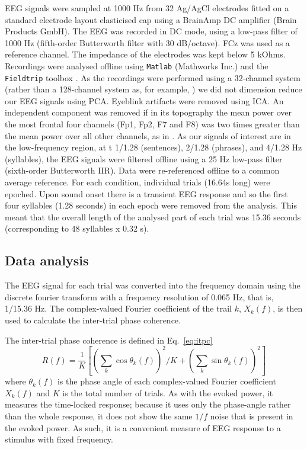\documentclass[a4paper,10pt,twoside]{article}
\begin{document}
EEG signals were sampled at 1000 Hz from 32 Ag/AgCl electrodes fitted on a standard electrode layout elasticised cap using a BrainAmp DC amplifier (Brain Products GmbH). The EEG was recorded in DC mode, using a low-pass filter of 1000 Hz (fifth-order Butterworth filter with 30 dB/octave). FCz was used as a reference channel. The impedance of the electrodes was kept below 5 kOhms. Recordings were analysed offline using \texttt{Matlab} (Mathworks Inc.) and the \texttt{Fieldtrip} toolbox \cite{FieldTrip}. As the recordings were performed using a 32-channel system (rather than a 128-channel system as, for example, \citet{DingEtAl2017}) we did not dimension reduce our EEG signals using PCA. Eyeblink artifacts were removed using ICA. An independent component was removed if in its topography the mean power over the most frontal four channels (Fp1, Fp2, F7 and F8) was two times greater than the mean power over all other channels, as in \citet{DingEtAl2017}. As our signals of interest are in the low-frequency region, at t 1/1.28 (sentences), 2/1.28 (phrases), and 4/1.28 Hz (syllables), the EEG signals were filtered offline using a 25 Hz low-pass filter (sixth-order Butterworth IIR). Data were re-referenced offline to a common average reference. For each condition, individual trials (16.64s long) were epoched. Upon sound onset there is a transient EEG response and so the first four syllables (1.28 seconds) in each epoch were removed from the analysis. This meant that the overall length of the analysed part of each trial was 15.36 seconds (corresponding to 48 syllables x 0.32 s).


\subsection*{Data analysis}

The EEG signal for each trial was converted into the frequency domain using the discrete
fourier transform with a frequency resolution of 0.065 Hz, that is, 1/15.36 Hz. The complex-valued Fourier coefficient of the trail $k$, $X_k(f)$, is then used to calculate the inter-trial phase coherence.

The inter-trial phase coherence is defined in Eq.~\ref{eq:itpc}
\begin{equation}
\label{eq:itpc}
R(f)=\frac{1}{K}\left[\left(\sum_k{\cos{\theta_k(f)}}\right)^2/K+\left(\sum_k{\sin{\theta_k(f)}}\right)^2\right]
\end{equation}
where $\theta_k(f)$ is the phase angle of each complex-valued Fourier coefficient $X_k(f)$ and $K$ is the total number of trials. As with the evoked power, it measures the time-locked response; because it uses only the phase-angle rather than the whole response, it does not show the same $1/f$ noise that is present in the evoked power. As such, it is a convenient measure of EEG response to a stimulus with fixed frequency.
\end{document}
